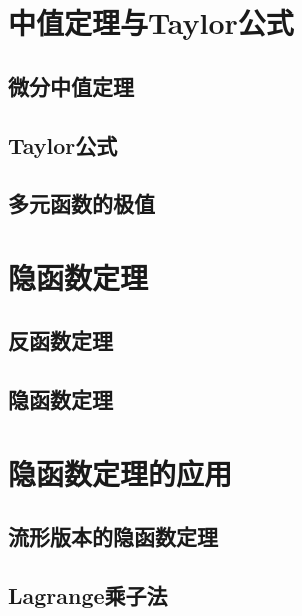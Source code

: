 \newpage
\section{中值定理与Taylor公式}

\subsection{微分中值定理}

\subsection{Taylor公式}

\subsection{多元函数的极值}

\newpage
\section{隐函数定理}

\subsection{反函数定理}

\subsection{隐函数定理}


\newpage
\section{隐函数定理的应用}

\subsection{流形版本的隐函数定理}

\subsection{Lagrange乘子法}